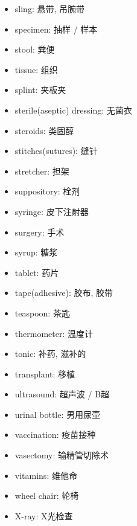 \begin{multicols}{2}
\begin{itemize}
  \item sling: 悬带, 吊腕带
  \item specimen: 抽样 / 样本
  \item stool: 粪便
  \item tissue: 组织
  \item splint: 夹板夹
  \item sterile(aseptic) dressing: 无菌衣
  \item steroids: 类固醇
  \item stitches(sutures): 缝针
  \item stretcher: 担架
  \item suppository: 栓剂
  \item syringe: 皮下注射器
  \item surgery: 手术
  \item syrup: 糖浆
  \item tablet: 药片
  \item tape(adhesive): 胶布, 胶带
  \item teaspoon: 茶匙
  \item thermometer: 温度计
  \item tonic: 补药, 滋补的
  \item transplant: 移植
  \item ultrasound: 超声波 / B超
  \item urinal bottle: 男用尿壶
  \item vaccination: 疫苗接种
  \item vasectomy: 输精管切除术
  \item vitamins: 维他命
  \item wheel chair: 轮椅
  \item X-ray: X光检查
\end{itemize}
\end{multicols}

